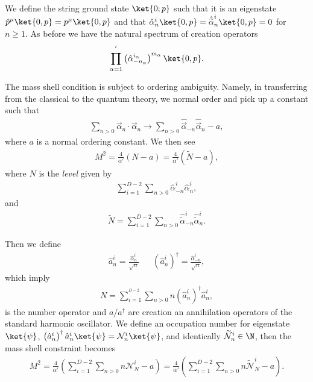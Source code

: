 
We define the string ground state $\ket{0; p}$ such that it is an eigenstate $\hat{p}^{\mu}\ket{0,p} = p^{\mu} \ket{0, p}$ and that $\hat{\alpha}^{i}_n \ket{0, p} = \hat{\widetilde{\alpha}}^{i}_n \ket{0,p} = 0$ for $n \geq 1$. As before we have the natural spectrum of creation operators
\begin{align}
    \prod_{\alpha=1}^{^{i}} \left( \hat{\alpha}^{i_{\alpha}}_{-n_{\alpha}} \right)^{m_\alpha} \ket{0, p}   
.\end{align}

The mass shell condition is subject to ordering ambiguity. Namely, in transferring from the classical to the quantum theory, we normal order and pick up a constant such that
\begin{align}
    \sum_{n > 0}^{} \vec{\alpha}_n \cdot \vec{\alpha}_n \to \sum_{n > 0}^{} \hat{\vec{\alpha}}_{-n} \hat{\vec{\alpha}}_{n} - a
,\end{align}
where $a$ is a normal ordering constant. We then see
\begin{align}
    M^2 = \frac{4}{\alpha'} \left( N - a \right) = \frac{4}{\alpha'} \left( \widetilde{N} - a \right) 
,\end{align}
where $N$ is the \emph{level} given by
\begin{align}
    \sum_{i=1}^{D-2}  \sum_{n > 0}^{}  \hat{\alpha}_{-n}^{i} \hat{\alpha}^{i}_n
,\end{align}
and
\begin{align}
    \widetilde{N} = \sum_{i=1}^{D-2} \sum_{n > 0}^{} \hat{\widetilde{\alpha}}_{-n}^{i} \hat{\widetilde{\alpha}}^{i}_n
.\end{align}

Then we define 
\begin{align}
    \hat{a}^{i}_n = \frac{\hat{\alpha}^{i}_n}{\sqrt{n} } && \left( \hat{a}^{i}_n \right)^{\dag}  = \frac{\hat{\alpha}^{i}_{-n}}{\sqrt{n} }
,\end{align}
which imply
\begin{align}
    N = \sum_{i=1}^{^{D-2}}  \sum_{n > 0}^{} n \left( \hat{a}^{i}_n \right)^{\dag} \hat{a}^{i}_n 
,\end{align}
is the number operator and $a/a^{\dag}$ are creation an annihilation operators of the standard harmonic oscillator. We define an occupation number for eigenstate $\ket{\psi}$, $\left( \hat{a}^{i}_n \right)^{\dag} \hat{a}^{i}_n \ket{\psi} = \mathcal{N}^{i}_n \ket{\psi}$, and identically $\widetilde{\mathcal{N}}^{i}_n \in \N$, then the mass shell constraint becomes
\begin{align}
    M^2 = \frac{4}{\alpha'} \left( \sum_{i=1}^{D-2}  \sum_{n > 0}^{} n \mathcal{N}^{i}_N - a \right) = \frac{4}{\alpha'} \left( \sum_{i=1}^{D-2}  \sum_{n > 0}^{} n \widetilde{\mathcal{N}}^{i}_N - a \right)
.\end{align}


